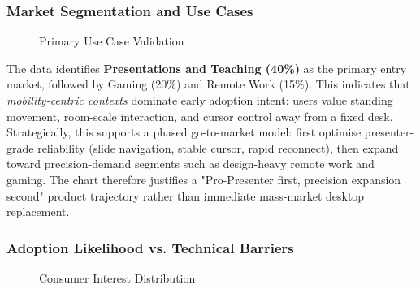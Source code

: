 \subsubsection{Market Segmentation and Use Cases}

\begin{figure}[H]
    \centering
    \caption{Primary Use Case Validation}
\end{figure}

The data identifies \textbf{Presentations and Teaching (40\%)} as the primary entry market, followed by Gaming (20\%) and Remote Work (15\%). This indicates that \textit{mobility-centric contexts} dominate early adoption intent: users value standing movement, room-scale interaction, and cursor control away from a fixed desk. Strategically, this supports a phased go-to-market model: first optimise presenter-grade reliability (slide navigation, stable cursor, rapid reconnect), then expand toward precision-demand segments such as design-heavy remote work and gaming. The chart therefore justifies a "Pro-Presenter first, precision expansion second" product trajectory rather than immediate mass-market desktop replacement.



\subsubsection{Adoption Likelihood vs. Technical Barriers}
\begin{figure}[H]
    \centering
    \caption{Consumer Interest Distribution}
\end{figure}

